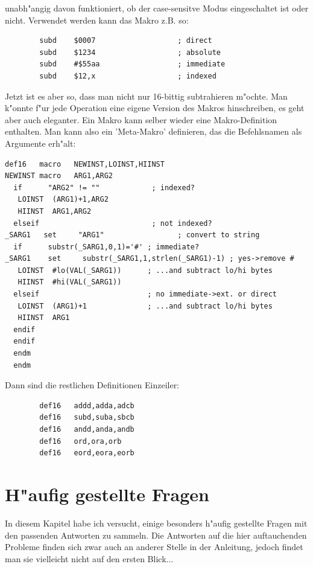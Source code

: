 \documentclass[12pt,a4paper,twoside]{report}
\begin{document}
unabh"angig davon funktioniert, ob der case-sensitve Modus eingeschaltet ist
oder nicht.  Verwendet werden kann das Makro z.B. so:
\begin{verbatim}
        subd    $0007                   ; direct
        subd    $1234                   ; absolute
        subd    #$55aa                  ; immediate
        subd    $12,x                   ; indexed
\end{verbatim}
Jetzt ist es aber so, dass man nicht nur 16-bittig subtrahieren m"ochte.  Man
k"onnte f"ur jede Operation eine eigene Version des Makros hinschreiben, es
geht aber auch eleganter.  Ein Makro kann selber wieder eine Makro-Definition
enthalten.  Man kann also ein 'Meta-Makro' definieren, das die Befehlsnamen
als Argumente erh"alt:
\begin{verbatim}
def16   macro   NEWINST,LOINST,HIINST
NEWINST macro   ARG1,ARG2
  if      "ARG2" != ""            ; indexed?
   LOINST  (ARG1)+1,ARG2
   HIINST  ARG1,ARG2
  elseif                          ; not indexed?
_SARG1   set     "ARG1"                 ; convert to string
  if      substr(_SARG1,0,1)='#' ; immediate?
_SARG1    set     substr(_SARG1,1,strlen(_SARG1)-1) ; yes->remove #
   LOINST  #lo(VAL(_SARG1))      ; ...and subtract lo/hi bytes
   HIINST  #hi(VAL(_SARG1))
  elseif                         ; no immediate->ext. or direct
   LOINST  (ARG1)+1              ; ...and subtract lo/hi bytes
   HIINST  ARG1
  endif
  endif
  endm
  endm
\end{verbatim}
Dann sind die restlichen Definitionen Einzeiler:
\begin{verbatim}
        def16   addd,adda,adcb
        def16   subd,suba,sbcb
        def16   andd,anda,andb
        def16   ord,ora,orb
        def16   eord,eora,eorb
\end{verbatim}


\cleardoublepage
\chapter{H"aufig gestellte Fragen}

In diesem Kapitel habe ich versucht, einige besonders h"aufig gestellte
Fragen mit den passenden Antworten zu sammeln.  Die Antworten auf
die hier auftauchenden Probleme finden sich zwar auch an anderer
Stelle in der Anleitung, jedoch findet man sie vielleicht nicht auf
den ersten Blick...
\end{document}
